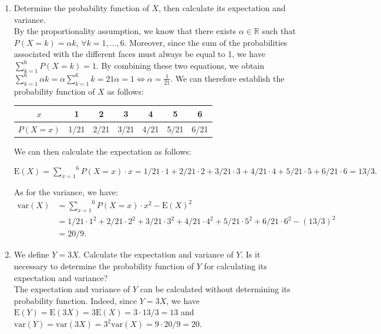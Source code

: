 \documentclass[12pt,thmsa]{article}\usepackage[]{graphicx}\usepackage[]{color}
\begin{document}
 \begin{enumerate}%
\item Determine the probability function of $X$, then calculate its expectation and variance.\\

By the proportionality assumption, we know that there exists $\alpha \in \mathbb{R}$ such that $P(X=k)=\alpha k$, $\forall k=1,\ldots,6$. Moreover, since the sum of the probabilities associated with the different faces must always be equal to 1, we have $\sum\limits_{k=1}^6 P(X=k)=1$. By combining these two equations, we obtain $\sum\limits_{k=1}^6 \alpha k=\alpha \sum\limits_{k=1}^6 k=21 \alpha=1 \iff \alpha=\frac{1}{21}$. We can therefore establish the probability function of $ X $ as follows:
			\begin{center}
			\begin{tabular}{|c|c|c|c|c|c|c|}
			\hline
			$x$ & 1 & 2 & 3 & 4 & 5 & 6 \\
			\hline
			$P(X=x)$ & 1/21 & 2/21 & 3/21 & 4/21 & 5/21 & 6/21\\
			\hline
			\end{tabular}
			\end{center}

We can then calculate the expectation as follows:

\begin{center}
$\mbox{E}(X) = \overset{6}{\underset{x=1}{\sum}}P(X=x)\cdot x = 1/21\cdot1 + 2/21\cdot 2 + 3/21\cdot3+4/21 \cdot 4 +5/21 \cdot 5+6/21 \cdot 6 =13/3.$
\end{center}

As for the variance, we have:
\begin{equation*}
\begin{split}
\mbox{var}(X) & = \overset{6}{\underset{x=1}{\sum}}P(X=x)\cdot x^2 -\mbox{E}(X)^2 \\
& = 1/21\cdot1^2 + 2/21\cdot 2^2 + 3/21\cdot3^2+4/21 \cdot 4^2 +5/21 \cdot 5^2+6/21 \cdot 6^2 -(13/3)^2 \\
& =20/9.
\end{split}
\end{equation*}

\item We define $Y = 3X$. Calculate the expectation and variance of $Y$. Is it necessary to determine the probability function of $Y$ for calculating its expectation and variance?\\

The expectation and variance of $ Y $ can be calculated without determining its probability function. Indeed, since $Y=3X$, we have $\mbox{E}(Y)=\mbox{E}(3X)=3\mbox{E}(X)=3\cdot 13/3=13$ and $\mbox{var}(Y)=\mbox{var}(3X)=3^2\mbox{var}(X)=9\cdot 20/9=20$.


\end{enumerate}
\end{document}
